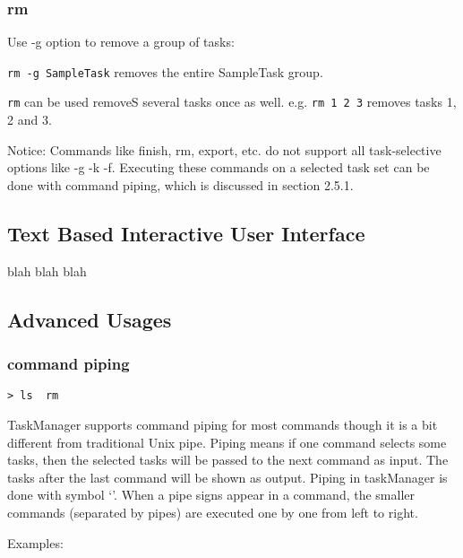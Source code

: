 \documentclass[12pt, a4paper]{article}
\begin{document}
\subsubsection{rm}
Use -g option to remove a group of tasks:

\texttt{rm -g SampleTask} removes the entire SampleTask group.

\texttt{rm} can be used removeS several tasks once as well. e.g. \texttt{rm 1 2 3} removes tasks 1, 2 and 3.


Notice: Commands like finish, rm, export, etc. do not support all task-selective options like -g -k -f.
Executing these commands on a selected task set can be done with command piping, which is discussed in section 2.5.1.

\subsection{Text Based Interactive User Interface}
blah blah blah

\subsection{Advanced Usages}
\subsubsection{command piping}

\texttt{\textgreater \ ls \textbar \  rm}

TaskManager supports command piping for most commands though it is a bit different from traditional Unix pipe.
Piping means if one command selects some tasks, then the selected tasks will be passed to the next command as input. The tasks after the last command will be shown as output.
Piping in taskManager is done with symbol `\textbar'. When a pipe signs appear in a command, the smaller commands (separated by pipes) are executed one by one from left to right. 

Examples:
\end{document}
